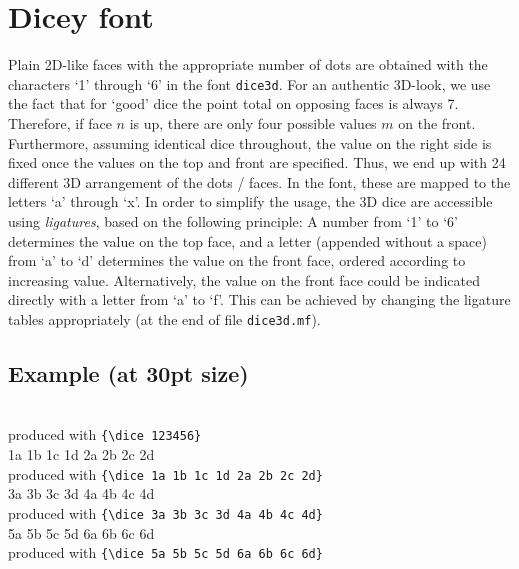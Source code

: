 \documentclass{article}
\begin{document}
\section*{Dicey font}
Plain 2D-like faces with the appropriate number of dots are obtained
with the characters `1' through `6' in the font \verb+dice3d+.
For an authentic 3D-look, we use the fact that for `good' dice the
point total on opposing faces is always 7. Therefore, if face $n$ is
up, there are only four possible values $m$ on the front. Furthermore,
assuming identical dice throughout, the value on the right side is
fixed once the values on the top and front are specified. Thus, we end up
with 24 different 3D arrangement of the dots / faces. In the font,
these are mapped to the letters `a' through `x'. In order to simplify
the usage, the 3D dice are accessible using \emph{ligatures}, based on the
following principle: A number from `1' to `6' determines the value on 
the top face, and a letter (appended without a space) from `a' to `d' 
determines the value on the front face, ordered according to increasing
value. Alternatively, the value on the front face could be indicated
directly with a letter from `a' to `f'. This can be achieved by changing
the ligature tables appropriately (at the end of file \verb+dice3d.mf+).

\subsection*{Example (at 30pt size)} 
\begin{flushleft}
{} \\
produced with \verb+{\dice 123456}+ \\[2ex]
{\dice 1a 1b 1c 1d 2a 2b 2c 2d} \\
produced with \verb+{\dice 1a 1b 1c 1d 2a 2b 2c 2d}+ \\[2ex]
{\dice 3a 3b 3c 3d 4a 4b 4c 4d} \\
produced with \verb+{\dice 3a 3b 3c 3d 4a 4b 4c 4d}+ \\[2ex]
{\dice 5a 5b 5c 5d 6a 6b 6c 6d} \\
produced with \verb+{\dice 5a 5b 5c 5d 6a 6b 6c 6d}+ 
\end{flushleft}
\end{document}
